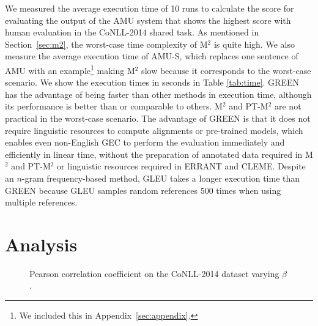 \documentclass[11pt]{article}
\begin{document}
We measured the average execution time of 10 runs to calculate the score for evaluating the output of the \textsf{AMU} system that shows the highest score with human evaluation in the CoNLL-2014 shared task.
As mentioned in Section~\ref{sec:m2}, the worst-case time complexity of M${}^2$ is quite high.
We also measure the average execution time of \textsf{AMU-S}, which replaces one sentence of \textsf{AMU} with an example\footnote{We included this in Appendix~\ref{sec:appendix}.} making M${}^2$ slow because it corresponds to the worst-case scenario.
We show the execution times in seconds in Table \ref{tab:time}.
GREEN has the advantage of being faster than other methods in execution time, although its performance is better than or comparable to others.
M${}^2$ and PT-M${}^2$ are not practical in the worst-case scenario.
The advantage of GREEN is that it does not require linguistic resources to compute alignments or pre-trained models, which enables even non-English GEC to perform the evaluation immediately and efficiently in linear time, without the preparation of annotated data required in M${}^2$ and PT-M${}^2$ or linguistic resources required in ERRANT and CLEME.
Despite an $n$-gram frequency-based method, GLEU takes a longer execution time than GREEN because GLEU samples random references 500 times when using multiple references.

\section{Analysis}
\label{sec:analysis}

\begin{figure}[!t]
    \centering
    \caption{Pearson correlation coefficient on the CoNLL-2014 dataset varying $\beta$.}
    \label{fig:beta}
\end{figure}
\end{document}
